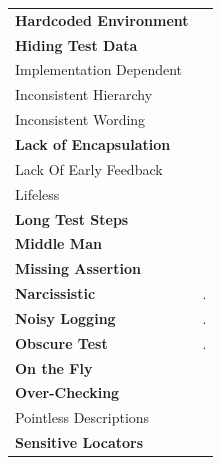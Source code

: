 \begin{table}
\begin{tabular}{>{\raggedright}p{1.5in}>{\raggedright}p{4in}}
\scriptsize{\textbf{Hardcoded Environment}} & \scriptsize{\cite{Gawinecki2016, Sheth2020}} \tabularnewline 

\scriptsize{\textbf{Hiding Test Data}} & \scriptsize{\cite{Jain2007}} \tabularnewline 

\scriptsize{Implementation Dependent}  & \scriptsize{\cite{Jain2007, Kapelonis2018, Goldberg2019}} \tabularnewline 

\scriptsize{Inconsistent Hierarchy} & \scriptsize{\cite{Clayton2014, Gawinecki2016, Buwalda2019}} \tabularnewline 

\scriptsize{Inconsistent Wording} & \scriptsize{\cite{Hauptmann2013}} \tabularnewline 

\scriptsize{\textbf{Lack of Encapsulation}} & \scriptsize{\cite{Chen2012, Evangelisti2012, Klarck2014, Buwalda2015, England2016, Renaudin2016, Knight2017a, Goldberg2019, Jones2019, Shay2019}} \tabularnewline 

\scriptsize{Lack Of Early Feedback} & \scriptsize{\cite{Dharmender2017}} \tabularnewline 

\scriptsize{Lifeless} & \scriptsize{\cite{Buwalda2015, Renaudin2016, Buwalda2019}} \tabularnewline 

\scriptsize{\textbf{Long Test Steps}} & \scriptsize{\cite{Chen2012, Hauptmann2013, Buwalda2019}} \tabularnewline

\scriptsize{\textbf{Middle Man}} & \scriptsize{\cite{Chen2012}} \tabularnewline 

\scriptsize{\textbf{Missing Assertion}} & \scriptsize{\cite{Klarck2014}} \tabularnewline 

\scriptsize{\textbf{Narcissistic}} & \scriptsize{\cite{England2016, Knight2017b}.} \tabularnewline

\scriptsize{\textbf{Noisy Logging}} & \scriptsize{\cite{Jain2007}.} \tabularnewline

\scriptsize{\textbf{Obscure Test}} & \scriptsize{\cite{Hauptmann2013, Gawinecki2016, Siminiuc2019}.} \tabularnewline

\scriptsize{\textbf{On the Fly}} & \scriptsize{\cite{Archer2010}} \tabularnewline 

\scriptsize{\textbf{Over-Checking}} & \scriptsize{\cite{Buwalda2015, Renaudin2016}} \tabularnewline

\scriptsize{Pointless Descriptions} & \scriptsize{\cite{England2016}} \tabularnewline 

\scriptsize{\textbf{Sensitive Locators}} & \scriptsize{\cite{Scott2015, Jones2019, Battat2020, Sheth2020}} \tabularnewline


\end{tabular}
\end{table}

